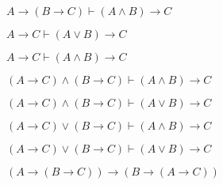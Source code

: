 \documentclass[
  ignorenonframetext,
]{beamer}
\renewcommand{\,}{\text{, }}
\begin{document}
\begin{frame}{\(A \rightarrow (B \rightarrow C) \vdash (A \wedge B) \rightarrow C\)}
\protect\hypertarget{a-rightarrow-b-rightarrow-c-vdash-a-wedge-b-rightarrow-c}{}

\end{frame}

\begin{frame}{\(A \rightarrow C \vdash (A \vee B) \rightarrow C\)}
\protect\hypertarget{a-rightarrow-c-vdash-a-vee-b-rightarrow-c}{}

\end{frame}

\begin{frame}{\(A \rightarrow C \vdash (A \wedge B) \rightarrow C\)}
\protect\hypertarget{a-rightarrow-c-vdash-a-wedge-b-rightarrow-c}{}

\end{frame}

\begin{frame}{\((A \rightarrow C) \wedge (B \rightarrow C) \vdash (A \wedge B) \rightarrow C\)}
\protect\hypertarget{a-rightarrow-c-wedge-b-rightarrow-c-vdash-a-wedge-b-rightarrow-c}{}

\end{frame}

\begin{frame}{\((A \rightarrow C) \wedge (B \rightarrow C) \vdash (A \vee B) \rightarrow C\)}
\protect\hypertarget{a-rightarrow-c-wedge-b-rightarrow-c-vdash-a-vee-b-rightarrow-c}{}

\end{frame}

\begin{frame}{\((A \rightarrow C) \vee (B \rightarrow C) \vdash (A \wedge B) \rightarrow C\)}
\protect\hypertarget{a-rightarrow-c-vee-b-rightarrow-c-vdash-a-wedge-b-rightarrow-c}{}

\end{frame}

\begin{frame}{\((A \rightarrow C) \vee (B \rightarrow C) \vdash (A \vee B) \rightarrow C\)}
\protect\hypertarget{a-rightarrow-c-vee-b-rightarrow-c-vdash-a-vee-b-rightarrow-c}{}

\end{frame}

\begin{frame}{\((A \rightarrow (B \rightarrow C)) \rightarrow (B \rightarrow (A \rightarrow C))\)}
\protect\hypertarget{a-rightarrow-b-rightarrow-c-rightarrow-b-rightarrow-a-rightarrow-c}{}

\end{frame}
\end{document}
